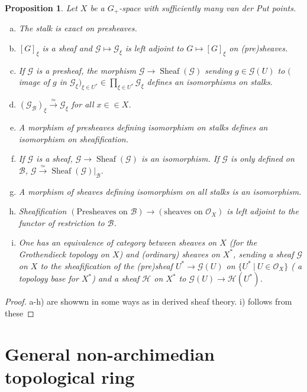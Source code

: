 \documentclass[8pt]{article}
\numberwithin{equation}{section}
\newtheorem{proposition}{Proposition}[subsection]
\DeclareMathOperator{\Sheaf}{Sheaf}
\newcommand{\Ouv}{\mathscr{O}}
\newcommand{\sep}[0]{\:|\:}
\newcommand{\cB}[0]{\mathcal{B}}
\begin{document}
\begin{proposition}
    \label{proposition_10_1}
    Let $X$ be a $G_+$-space with sufficiently many van der Put points.
    \begin{enumerate}[a)]
        \item The stalk is exact on presheaves.
        \item $[G]_\xi$ is a sheaf and $\mathcal{G}\mapsto\mathcal{G}_\xi$ is left adjoint to $G\mapsto [G]_\xi$ on (pre)sheaves.
        \item If $\mathcal{G}$ is a presheaf, the morphism $\mathcal{G}\to\Sheaf(\mathcal{G})$ sending $g\in\mathcal{G}(U)$ to $($image of $g$ in $\mathcal{G}_\xi)_{\xi\in U^*}\in\prod_{\xi\in U^*}\mathcal{G}_\xi$ defines an isomorphisms on stalks. 
        \item $(\mathcal{G}_\cB)_\xi\stackrel{\simeq}{\to}\mathcal{G}_\xi$ for all $x\in\in X$. 
        \item A morphism of presheaves defining isomorphism on stalks defines an isomorphism on sheafification. 
        \item If $\mathcal{G}$ is a sheaf, $\mathcal{G}\to\Sheaf(\mathcal{G})$ is an isomorphism. If $\mathcal{G}$ is only defined on $\cB$, $\mathcal{G}\stackrel{\simeq}{\to}\Sheaf(\mathcal{G})|_\cB$.
        \item A morphism of sheaves defining isomorphism on all stalks is an isomorphism.
        \item Sheafification $(\text{Presheaves on $\cB$})\to(\text{sheaves on $\Ouv_X$})$ is left adjoint to the functor of restriction to $\cB$.
        \item One has an equivalence of category between sheaves on $X$ (for the Grothendieck topology on $X$) and (ordinary) sheaves on $X^*$, sending a sheaf $\mathcal{G}$ on $X$ to the sheafification of the (pre)sheaf $U^*\to \mathcal{G}(U)$ on $\{U^*\sep U\in\Ouv_X\}$ ( a topology base for $X^*$) and a sheaf $\mathcal{H}$ on $X^*$ to $\mathcal{G}(U)\to\mathcal{H}(U^*)$. 
    \end{enumerate}
\end{proposition}

\begin{proof}
    a-h) are showwn in some ways as in derived sheaf theory. i) follows from these 
\end{proof}


\section{General non-archimedian topological ring}
\end{document}

